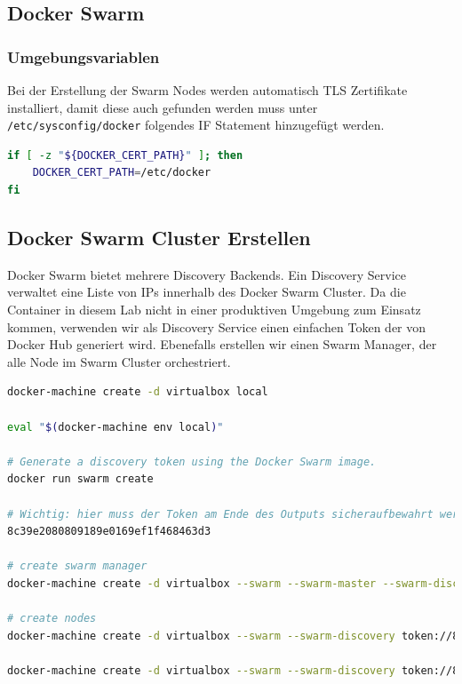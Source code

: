 \subsection{Docker Swarm}
\subsubsection{Umgebungsvariablen}
Bei der Erstellung der Swarm Nodes werden automatisch TLS Zertifikate installiert, damit diese auch gefunden werden muss unter \lstinline[]|/etc/sysconfig/docker| folgendes IF Statement hinzugefügt werden. 
\begin{lstlisting}[caption=/etc/sysconfig/docker, language=bash]
if [ -z "${DOCKER_CERT_PATH}" ]; then
	DOCKER_CERT_PATH=/etc/docker
fi
\end{lstlisting}

\subsection{Docker Swarm Cluster Erstellen}
Docker Swarm bietet mehrere Discovery Backends. Ein Discovery Service verwaltet eine Liste von IPs innerhalb des Docker Swarm Cluster. Da die Container in diesem Lab nicht in einer produktiven Umgebung zum Einsatz kommen, verwenden wir als Discovery Service einen einfachen Token der von Docker Hub generiert wird. Ebenefalls erstellen wir einen Swarm Manager, der alle Node im Swarm Cluster orchestriert.

\begin{lstlisting}[language=bash]
docker-machine create -d virtualbox local

eval "$(docker-machine env local)"

# Generate a discovery token using the Docker Swarm image.
docker run swarm create

# Wichtig: hier muss der Token am Ende des Outputs sicheraufbewahrt werden: 
8c39e2080809189e0169ef1f468463d3

# create swarm manager
docker-machine create -d virtualbox --swarm --swarm-master --swarm-discovery token://8c39e2080809189e0169ef1f468463d3 swarm-master

# create nodes
docker-machine create -d virtualbox --swarm --swarm-discovery token://8c39e2080809189e0169ef1f468463d3 node01

docker-machine create -d virtualbox --swarm --swarm-discovery token://8c39e2080809189e0169ef1f468463d3 node01
\end{lstlisting}

